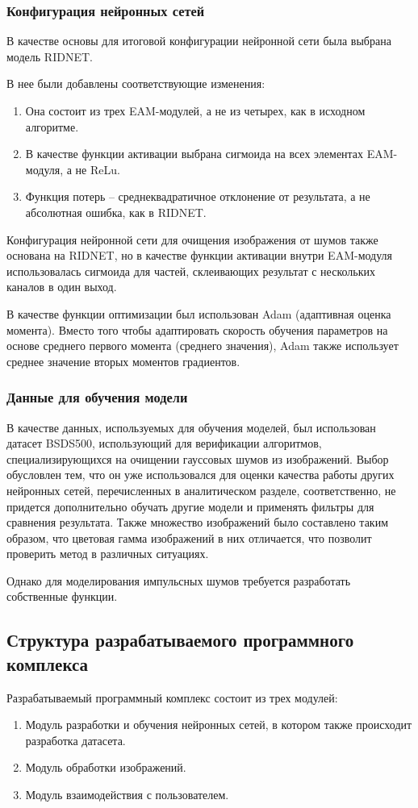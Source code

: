 \subsubsection{Конфигурация нейронных сетей}
В качестве основы для итоговой конфигурации нейронной сети была выбрана модель RIDNET.

В нее были добавлены соответствующие изменения:
\begin{enumerate}
	\item Она состоит из трех EAM-модулей, а не из четырех, как в исходном алгоритме.
	\item В качестве функции активации выбрана сигмоида на всех элементах EAM-модуля, а не ReLu.
	\item Функция потерь -- среднеквадратичное отклонение от результата, а не абсолютная ошибка, как в RIDNET.
\end{enumerate}

Конфигурация нейронной сети для очищения изображения от шумов также основана на RIDNET, но в качестве функции активации внутри EAM-модуля использовалась сигмоида для частей, склеивающих результат с нескольких каналов в один выход.

В качестве функции оптимизации был использован Adam (адаптивная оценка момента).
Вместо того чтобы адаптировать скорость обучения параметров на основе среднего первого момента (среднего значения), Adam также использует среднее значение вторых моментов градиентов.

\subsubsection{Данные для обучения модели}
В качестве данных, используемых для обучения моделей, был использован датасет BSDS500, использующий для верификации алгоритмов, специализирующихся на очищении гауссовых шумов из изображений.
Выбор обусловлен тем, что он уже использовался для оценки качества работы других нейронных сетей, перечисленных в аналитическом разделе, соответственно, не придется дополнительно обучать другие модели и применять фильтры для сравнения результата.
Также множество изображений было составлено таким образом, что цветовая гамма изображений в них отличается, что позволит проверить метод в различных ситуациях.

Однако для моделирования импульсных шумов требуется разработать собственные функции.

\subsection{Структура разрабатываемого программного комплекса}
Разрабатываемый программный комплекс состоит из трех модулей:
\begin{enumerate}
	\item Модуль разработки и обучения нейронных сетей, в котором также происходит разработка датасета.
	\item Модуль обработки изображений.
	\item Модуль взаимодействия с пользователем.
\end{enumerate}

